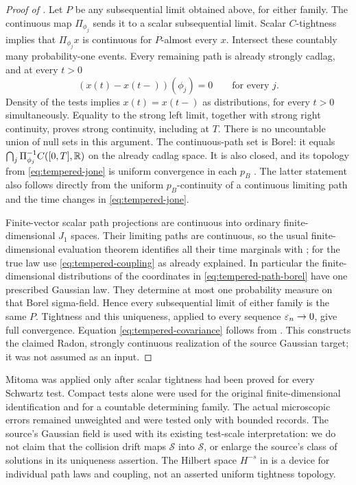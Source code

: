 \begin{proof}[Proof of ]
Let $P$ be any subsequential limit obtained above, for either family.
The continuous map $\Pi_{\phi_j}$ sends it to a scalar subsequential
limit. Scalar $C$-tightness implies that $\Pi_{\phi_j}x$ is continuous
for $P$-almost every $x$.
Intersect these countably many probability-one events.
Every remaining path is already strongly cadlag, and at every $t>0$
\[
       (x(t)-x(t-))(\phi_j)=0\qquad\text{for every }j.
\]
Density of the tests implies $x(t)=x(t-)$ as distributions, for every
$t>0$ simultaneously. Equality to the strong left limit, together
with strong right continuity, proves strong continuity, including
at $T$. There is no uncountable union of null sets in this argument.
The continuous-path set is Borel: it equals
$\bigcap_j\Pi_{\phi_j}^{-1}C([0,T],\mathbb R)$ on the already cadlag space.
It is also closed, and its topology from
\eqref{eq:tempered-jone} is uniform convergence in each $p_B$
\cite[Proposition 1.6(i)]{Jakubowski}.
The latter statement also follows directly from the uniform
$p_B$-continuity of a continuous limiting path and the time changes
in \eqref{eq:tempered-jone}.

Finite-vector scalar path projections are continuous into ordinary
finite-dimensional $J_1$ spaces. Their limiting paths are continuous,
so the usual finite-dimensional evaluation theorem identifies all
their time marginals with ; for the true law
use \eqref{eq:tempered-coupling} as already explained.
In particular the finite-dimensional distributions of the coordinates
in \eqref{eq:tempered-path-borel} have one prescribed Gaussian law.
They determine at most one probability measure on that Borel
sigma-field. Hence every subsequential limit of either family is the
same $P$. Tightness and this uniqueness, applied to every sequence
$\varepsilon_n\to0$, give full convergence.
Equation \eqref{eq:tempered-covariance} follows from
. This constructs the claimed Radon, strongly
continuous realization of the source Gaussian target; it was not
assumed as an input.
\end{proof}

\begin{remark}
Mitoma was applied only after scalar tightness had been proved for
every Schwartz test. Compact tests alone were used for the original
finite-dimensional identification and for a countable determining
family. The actual microscopic errors remained unweighted and were
tested only with bounded records. The source's Gaussian field is used
with its existing test-scale interpretation: we do not claim that the
collision drift maps $\mathcal S$ into $\mathcal S$, or enlarge the
source's class of solutions in its uniqueness assertion.
The Hilbert space $H^{-s}$ in  is a
device for individual path laws and coupling, not an asserted
uniform tightness topology.
\end{remark}
